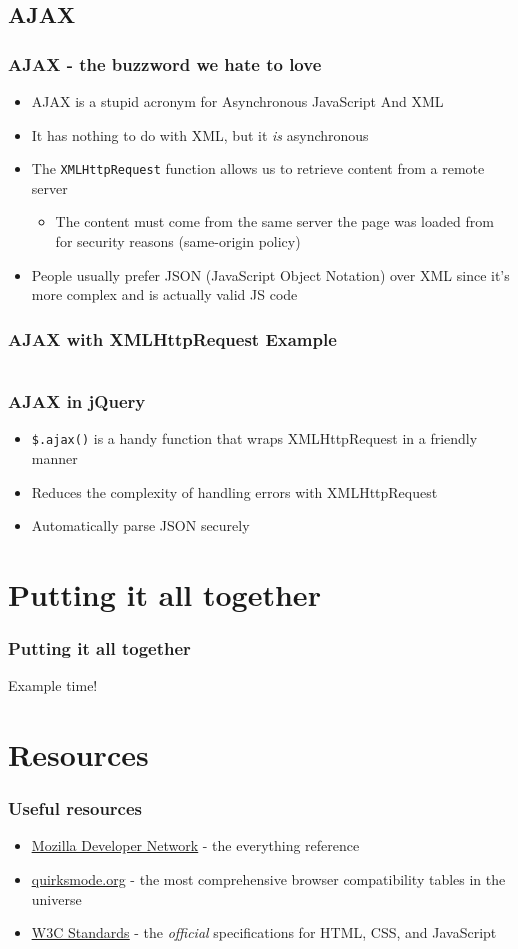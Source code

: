 \documentclass[10pt]{beamer}
\begin{document}
\subsection{AJAX}
\frame
{
  \frametitle{AJAX - the buzzword we hate to love}

  \begin{itemize}
    \item AJAX is a stupid acronym for Asynchronous JavaScript And XML
    \item It has nothing to do with XML, but it \emph{is} asynchronous
    \item The \lstinline|XMLHttpRequest| function allows us to retrieve content from a remote server
      \begin{itemize}
        \item The content must come from the same server the page was loaded from for security reasons (same-origin policy)
      \end{itemize}
    \item People usually prefer JSON (JavaScript Object Notation) over XML since it's more complex and is actually valid JS code
  \end{itemize}
}

\frame
{
  \frametitle{AJAX with XMLHttpRequest Example}

  \inputminted{javascript}{./code/xmlhttprequest.js}
}

\frame
{
  \frametitle{AJAX in jQuery}

  \begin{itemize}
    \item \lstinline|$.ajax()| is a handy function that wraps XMLHttpRequest in a friendly manner
    \item Reduces the complexity of handling errors with XMLHttpRequest
    \item Automatically parse JSON securely
  \end{itemize}
}

\section{Putting it all together}
\frame
{
  \frametitle{Putting it all together}

  Example time!
}

\section{Resources}
\frame
{
  \frametitle{Useful resources}
  \begin{itemize}
    \item \underline{\href{''https://developer.mozilla.org/en-US/''}{Mozilla Developer Network}} - the everything reference
    \item \underline{\href{''http://www.quirksmode.org/''}{quirksmode.org}} - the most comprehensive browser compatibility tables in the universe
    \item \underline{\href{''http://www.w3.org/standards/webdesign/''}{W3C Standards}} - the \emph{official} specifications for HTML, CSS, and JavaScript
  \end{itemize}
}
\end{document}
